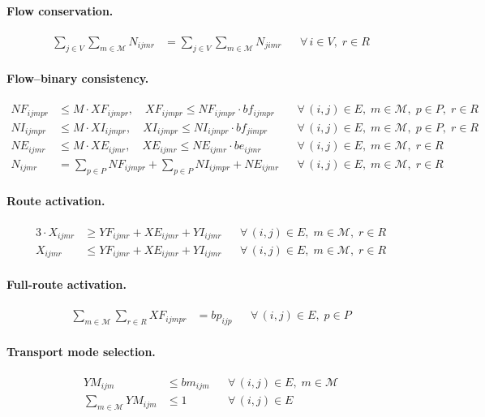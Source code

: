 \begin{ChapterAppendix}
\paragraph{Flow conservation.}
\begin{align}
  \sum_{j\in V} \sum_{m\in\mathcal{M}} N_{ijmr} &= \sum_{j\in V} \sum_{m\in\mathcal{M}} N_{jimr}
  && \forall\,i\in V,\;r\in R
\end{align}

\paragraph{Flow--binary consistency.}
\begin{align}
  NF_{ijmpr} &\leq M\cdot XF_{ijmpr}, \quad XF_{ijmpr} \leq NF_{ijmpr}\cdot bf_{ijmpr}
  && \forall\,(i,j)\in E,\;m\in\mathcal{M},\;p\in P,\;r\in R \\
  NI_{ijmpr} &\leq M\cdot XI_{ijmpr}, \quad XI_{ijmpr} \leq NI_{ijmpr}\cdot bf_{jimpr}
  && \forall\,(i,j)\in E,\;m\in\mathcal{M},\;p\in P,\;r\in R \\
  NE_{ijmr} &\leq M\cdot XE_{ijmr}, \quad XE_{ijmr} \leq NE_{ijmr}\cdot be_{ijmr}
  && \forall\,(i,j)\in E,\;m\in\mathcal{M},\;r\in R \\ 
  N_{ijmr} &= \sum_{p\in P} NF_{ijmpr} + \sum_{p\in P} NI_{ijmpr} + NE_{ijmr}
  && \forall\,(i,j)\in E,\;m\in\mathcal{M},\;r\in R
\end{align}

\paragraph{Route activation.}
\begin{align}
  3\cdot X_{ijmr}
    &\geq YF_{ijmr} + XE_{ijmr} + YI_{ijmr}
  && \forall\,(i,j)\in E,\;m\in\mathcal{M},\;r\in R \\
  X_{ijmr}
  &\leq  YF_{ijmr} + XE_{ijmr} + YI_{ijmr}
  && \forall\,(i,j)\in E,\;m\in\mathcal{M},\;r\in R
\end{align}

\paragraph{Full-route activation.}
\begin{align}
  \sum_{m\in\mathcal{M}} \sum_{r\in R} XF_{ijmpr} &= bp_{ijp}
  && \forall\,(i,j)\in E,\;p\in P
\end{align}

\paragraph{Transport mode selection.}
\begin{align}
  YM_{ijm}
    &\leq bm_{ijm}
  && \forall\,(i,j)\in E,\;m\in\mathcal{M} \\
  \sum_{m\in\mathcal{M}} YM_{ijm}
    &\leq 1
  && \forall\,(i,j)\in E
\end{align}


\end{ChapterAppendix}
